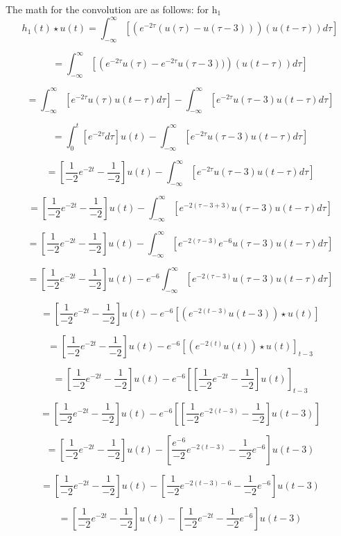 \documentclass[12pt,a4paper]{article}
\begin{document}
The math for the convolution are as follows:
for h$_1$
\[h_1(t)\star u(t) = \int_{-\infty}^\infty \left [ \left (e^{-2\tau}(u(\tau)-u(\tau-3))\right ) \left (u(t-\tau)\right ) d \tau \right ]\]

\[ = \int_{-\infty}^\infty \left [ \left (e^{-2\tau}u(\tau)-e^{-2\tau}u(\tau-3))\right ) \left (u(t-\tau)\right ) d \tau \right ]\]

\[ = \int_{-\infty}^\infty \left [ e^{-2\tau}u(\tau)u(t-\tau) d \tau \right ]- \int_{-\infty}^\infty \left [ e^{-2\tau}u(\tau-3) u(t-\tau) d \tau \right ]\]

\[ = \int_{0}^t \left [ e^{-2\tau}d \tau \right ]u(t)- \int_{-\infty}^\infty \left [ e^{-2\tau}u(\tau-3) u(t-\tau) d \tau \right ]\]

\[ =\left [\frac{1}{-2}e^{-2t} -\frac{1}{-2} \right ]u(t)- \int_{-\infty}^\infty \left [ e^{-2\tau}u(\tau-3) u(t-\tau) d \tau \right ]\]

\[ =\left [\frac{1}{-2}e^{-2t} -\frac{1}{-2} \right ]u(t)- \int_{-\infty}^\infty \left [ e^{-2(\tau-3+3)}u(\tau-3) u(t-\tau) d \tau \right ]\]

\[ =\left [\frac{1}{-2}e^{-2t} -\frac{1}{-2} \right ]u(t)- \int_{-\infty}^\infty \left [ e^{-2(\tau-3)}e^{-6}u(\tau-3) u(t-\tau) d \tau \right ]\]

\[ =\left [\frac{1}{-2}e^{-2t} -\frac{1}{-2} \right ]u(t)- e^{-6}\int_{-\infty}^\infty \left [ e^{-2(\tau-3)}u(\tau-3) u(t-\tau) d \tau \right ]\]

\[ =\left [\frac{1}{-2}e^{-2t} -\frac{1}{-2} \right ]u(t)- e^{-6} \left [ \left( e^{-2(t-3)}u(t-3)\right )\star u(t) \right ]\]

\[ =\left [\frac{1}{-2}e^{-2t} -\frac{1}{-2} \right ]u(t)- e^{-6} \left [ \left( e^{-2(t)}u(t)\right )\star u(t) \right ]_{t-3} \]

\[ =\left [\frac{1}{-2}e^{-2t} -\frac{1}{-2} \right ]u(t)- e^{-6} \left [\left [\frac{1}{-2}e^{-2t} -\frac{1}{-2} \right ]u(t)\right ]_{t-3} \]

\[ =\left [\frac{1}{-2}e^{-2t} -\frac{1}{-2} \right ]u(t)- e^{-6} \left [\left [\frac{1}{-2}e^{-2(t-3)} -\frac{1}{-2} \right ]u(t-3)\right ] \]

\[ =\left [\frac{1}{-2}e^{-2t} -\frac{1}{-2} \right ]u(t)- \left[  \frac{e^{-6}}{-2}e^{-2(t-3)} -\frac{1}{-2}e^{-6} \right ]u(t-3) \]

\[ =\left [\frac{1}{-2}e^{-2t} -\frac{1}{-2} \right ]u(t)-  \left [\frac{1}{-2}e^{-2(t-3)-6} -\frac{1}{-2}e^{-6} \right ]u(t-3) \]

\[ =\left [\frac{1}{-2}e^{-2t} -\frac{1}{-2} \right ]u(t)-  \left[\frac{1}{-2}e^{-2t} -\frac{1}{-2}e^{-6} \right ]u(t-3)\]
\end{document}
